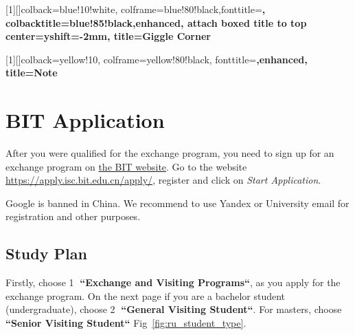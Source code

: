 


[1][]{colback=blue!10!white,
    colframe=blue!80!black,fonttitle=\bfseries,
    colbacktitle=blue!85!black,enhanced,
    attach boxed title to top center={yshift=-2mm},
    title={Giggle Corner}
}

[1][]{colback=yellow!10,
    colframe=yellow!80!black,
    fonttitle=\bfseries,enhanced,
    title={Note}
}






\chapter{BIT Application}\label{ch:ru_application}

After you were qualified for the exchange program,
you need to sign up for an exchange program on
\href{https://apply.isc.bit.edu.cn/apply/}{the BIT website}.
Go to the website \url{https://apply.isc.bit.edu.cn/apply/},
register and click on \textit{Start Application}.

\begin{note}
    Google is banned in China.
    We recommend to use Yandex or University email
    for registration and other purposes.
\end{note}







\section{Study Plan}\label{sec:study_plan}

Firstly, choose \textcircled{1} \textbf{``Exchange and Visiting Programs``},
as you apply for the exchange program.
On the next page if you are a bachelor student (undergraduate),
choose \textcircled{2} \textbf{``General Visiting Student``}.
For masters, choose \textbf{``Senior Visiting Student``}
Fig~\ref{fig:ru_student_type}.


